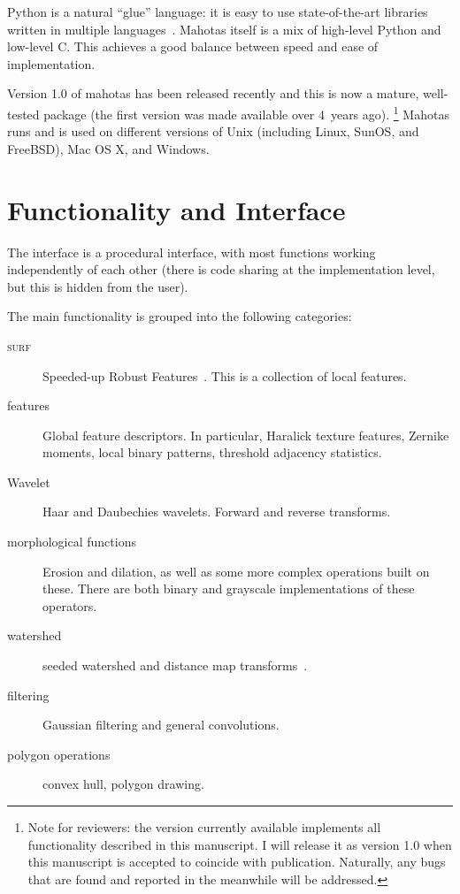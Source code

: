 \documentclass{article}
\newcommand*{\cpp}{{C\nolinebreak[4]\hspace{-.05em}\raisebox{.4ex}{\tiny\textbf{++}}}}
\begin{document}
Python is a natural ``glue'' language: it is easy to use state-of-the-art
libraries written in multiple languages~\citep{10.1109/MCSE.2007.58}. Mahotas
itself is a mix of high-level Python and low-level \cpp{}. This achieves a good
balance between speed and ease of implementation.

Version 1.0 of mahotas has been released recently and this is now a mature,
well-tested package (the first version was made available over 4~years ago).
\footnote{Note for reviewers: the version currently available implements all
functionality described in this manuscript. I will release it as version 1.0
when this manuscript is accepted to coincide with publication. Naturally, any
bugs that are found and reported in the meanwhile will be addressed.} Mahotas
runs and is used on different versions of Unix (including Linux, SunOS, and
FreeBSD), Mac OS X, and Windows.

\section{Functionality and Interface}

The interface is a procedural interface, with most functions working
independently of each other (there is code sharing at the implementation
level, but this is hidden from the user).

The main functionality is grouped into the following categories:

\begin{description}
\item[\textsc{surf}] Speeded-up Robust Features~\citep{eth_biwi_00517}. This is
a collection of local features.
\item[features] Global feature descriptors. In particular, Haralick texture
features, Zernike moments, local binary patterns, threshold adjacency
statistics.
\item[Wavelet] Haar and Daubechies wavelets. Forward and reverse transforms.
\item[morphological functions] Erosion and dilation, as well as some more
complex operations built on these. There are both binary and grayscale
implementations of these operators.
\item[watershed] seeded watershed and distance map
transforms~\citep{felzenszwalb}.
\item[filtering] Gaussian filtering and general convolutions.
\item[polygon operations] convex hull, polygon drawing.
\end{description}
\end{document}
